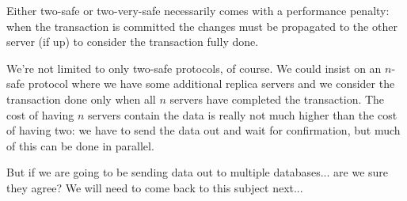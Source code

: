 Either two-safe or two-very-safe necessarily comes with a performance penalty: when the transaction is committed the changes must be propagated to the other server (if up) to consider the transaction fully done.

We're not limited to only two-safe protocols, of course. We could insist on an $n$-safe protocol where we have some additional replica servers and we consider the transaction done only when all $n$ servers have completed the transaction. The cost of having $n$ servers contain the data is really not much higher than the cost of having two: we have to send the data out and wait for confirmation, but much of this can be done in parallel.

But if we are going to be sending data out to multiple databases... are we sure they agree? We will need to come back to this subject next...




